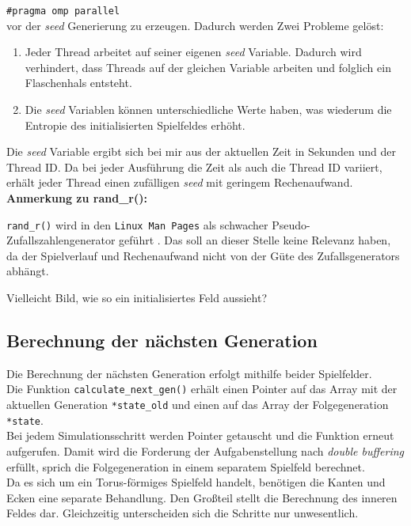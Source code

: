 \documentclass[german,plainarticle,hyperref,utf8]{zihpub}
\begin{document}
	\texttt{\#pragma omp parallel}\\
	
	vor der \textit{seed} Generierung zu erzeugen. Dadurch werden Zwei Probleme gelöst:
	\begin{enumerate}
		\item Jeder Thread arbeitet auf seiner eigenen \textit{seed} Variable. Dadurch wird verhindert, dass Threads auf der gleichen Variable arbeiten und folglich ein Flaschenhals entsteht.
		\item Die \textit{seed} Variablen können unterschiedliche Werte haben, was wiederum die Entropie des initialisierten Spielfeldes erhöht.
	\end{enumerate}
	
	Die \textit{seed} Variable ergibt sich bei mir aus der aktuellen Zeit in Sekunden und der Thread ID. Da bei jeder Ausführung die Zeit als auch die Thread ID variiert, erhält jeder Thread einen zufälligen \textit{seed} mit geringem Rechenaufwand.\\
	
	\textbf{Anmerkung zu rand\_r():}
	
	\texttt{rand\_r()} wird in den \texttt{Linux Man Pages} als schwacher Pseudo-Zufallszahlengenerator geführt \cite{lmp}. Das soll an dieser Stelle keine Relevanz haben, da der Spielverlauf und Rechenaufwand nicht von der Güte des Zufallsgenerators abhängt.
	
	Vielleicht Bild, wie so ein initialisiertes Feld aussieht?
	
	\subsection{Berechnung der nächsten Generation}
	Die Berechnung der nächsten Generation erfolgt mithilfe beider Spielfelder.\\ Die Funktion \texttt{calculate\_next\_gen()} erhält einen Pointer auf das Array mit der aktuellen Generation \texttt{*state\_old} und einen auf das Array der Folgegeneration \texttt{*state}.\\
	Bei jedem Simulationsschritt werden Pointer getauscht und die Funktion erneut aufgerufen. Damit wird die Forderung der Aufgabenstellung nach \textit{double buffering} erfüllt, sprich die Folgegeneration in einem separatem Spielfeld berechnet.\\
	Da es sich um ein Torus-förmiges Spielfeld handelt, benötigen die Kanten und Ecken eine separate Behandlung. Den Großteil stellt die Berechnung des inneren Feldes dar. Gleichzeitig unterscheiden sich die Schritte nur unwesentlich.\\
	
\end{document}
